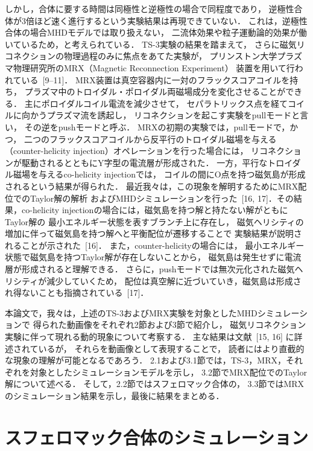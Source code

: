 \documentclass{jspf}            %
\begin{document}
しかし，合体に要する時間は同極性と逆極性の場合で同程度であり，
逆極性合体が3倍ほど速く進行するという実験結果は再現できていない．
これは，逆極性合体の場合MHDモデルでは取り扱えない，
二流体効果や粒子運動論的効果が働いているため，と考えられている．
TS-3実験の結果を踏まえて，
さらに磁気リコネクションの物理過程のみに焦点をあてた実験が，
プリンストン大学プラズマ物理研究所のMRX（Magnetic Reconnection Experiment）
装置を用いて行われている~[9--11]．
MRX装置は真空容器内に一対のフラックスコアコイルを持ち，
プラズマ中のトロイダル・ポロイダル両磁場成分を変化させることができる．
主にポロイダルコイル電流を減少させて，
セパラトリックス点を経てコイルに向かうプラズマ流を誘起し，
リコネクションを起こす実験をpullモードと言い，
その逆をpushモードと呼ぶ．
MRXの初期の実験では，pullモードで，かつ，
二つのフラックスコアコイルから反平行のトロイダル磁場を与える
（counter-helicity injection）オペレーションを行った場合には，
リコネクションが駆動されるとともにY字型の電流層が形成された．
一方，平行なトロイダル磁場を与えるco-helicity injectionでは，
コイルの間にO点を持つ磁気島が形成されるという結果が得られた．
最近我々は，この現象を解明するためにMRX配位でのTaylor解の解析
およびMHDシミュレーションを行った~[16, 17]．その結果，co-helicity
injectionの場合には，磁気島を持つ解と持たない解がともにTaylor解の
最小エネルギー状態を表すブランチ上に存在し，
磁気ヘリシティの増加に伴って磁気島を持つ解へと平衡配位が遷移することで
実験結果が説明されることが示された~[16]．
また，counter-helicityの場合には，
最小エネルギー状態で磁気島を持つTaylor解が存在しないことから，
磁気島は発生せずに電流層が形成されると理解できる．
さらに，pushモードでは無次元化された磁気ヘリシティが減少していくため，
配位は真空解に近づいていき，磁気島は形成され得ないことも指摘されている~[17]．

本論文で，我々は，上述のTS-3およびMRX実験を対象としたMHDシミュレーションで
得られた動画像をそれぞれ2節および3節で紹介し，
磁気リコネクション実験に伴って現れる動的現象について考察する．
主な結果は文献~[15, 16] に詳述されているが，
それらを動画像として表現することで，
読者にはより直截的な現象の理解が可能となるであろう．
2.1および3.1節では，TS-3，MRX，それぞれを対象としたシミュレーションモデルを示し，
3.2節でMRX配位でのTaylor解について述べる．
そして，2.2節ではスフェロマック合体の，
3.3節ではMRXのシミュレーション結果を示し，最後に結果をまとめる．

\section{スフェロマック合体のシミュレーション}
\end{document}
